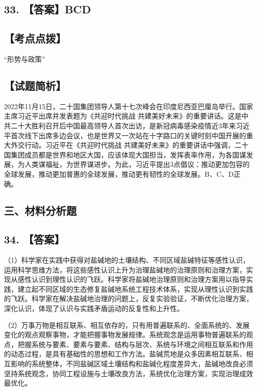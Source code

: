 \documentclass[UTF8,11pt]{ctexart}
\begin{document}
\subsection*{33. 【答案】BCD}

\subsection*{【考点点拨】}

“形势与政策”


\subsection*{【试题简析】}

2022年11月15日，二十国集团领导人第十七次峰会在印度尼西亚巴厘岛举行。国家主席习近平出席并发表题为《共迎时代挑战 共建美好未来》的重要讲话。这是中共二十大胜利召开后中国最高领导人首次出访，是新冠病毒感染疫情近3年来习近平首次线下出席多边会议，也是世界又一次站在十字路口的关键时刻中国开展的重大外交行动。习近平在《共迎时代挑战 共建美好未来》的重要讲话中强调，二十国集团成员都是世界和地区大国，应该体现大国担当，发挥表率作用，为各国谋发展，为人类谋福祉，为世界谋进步。为此，习近平提出3点倡议：推动更加包容的全球发展，推动更加普惠的全球发展，推动更有韧性的全球发展。B、C、D正确。


\subsection*{三、材料分析题}

\subsection*{34. 【答案】}

（1）科学家在实践中获得对盐碱地的土壤结构、不同区域盐碱特征等感性认识，运用科学思维方法，将这些感性认识上升为治理盐碱地的治理原则和治理方案，实现从感性认识到理性认识的飞跃。科学家将盐碱地治理原则和治理方案用以指导实践，建立起不同区域的生态修复盐碱地系统工程技术体系，实现从理性认识到实践的飞跃。科学家在解决盐碱地治理的问题上，反复实验验证，不断优化治理方案，深化认识，体现了认识与实践矛盾运动的反复性和上升性。


（2）万事万物是相互联系、相互依存的，只有用普遍联系的、全面系统的、发展变化的观点观察事物，才能把握事物发展规律。系统观念是运用事物普遍联系的观点，把握系统与要素、要素与要素、结构与层次、系统与环境之间相互联系和作用的动态过程，是具有基础性的思想和工作方法。盐碱荒地是众多因素相互联系、相互影响的系统整体，不同盐碱区域土壤结构和盐碱化程度差异大，盐碱地改良必须坚持系统观念，协同工程设施与土壤改良方法，系统优化治理方案，实现治理成效最优化。
\end{document}
